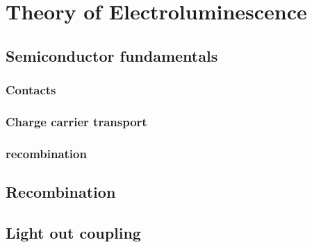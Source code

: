 
\chapter{Theory of Electroluminescence}

\section{Semiconductor fundamentals}
\subsection{Contacts}
\subsection{Charge carrier transport}
\subsection{recombination}

\section{Recombination}
\section{Light out coupling}

